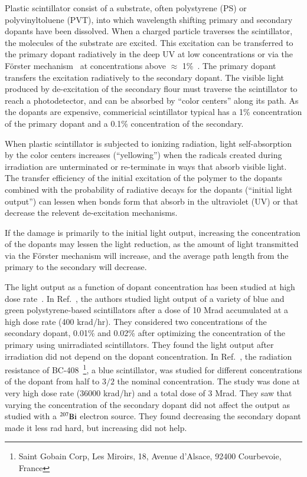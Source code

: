 \documentclass[review]{elsarticle}
\begin{document}
Plastic scintillator consist of a substrate, 
often polystyrene (PS) or polyvinyltoluene (PVT),
into which wavelength 
shifting primary and secondary dopants have been dissolved.
When a charged particle traverses the scintillator, the molecules of the substrate are excited.  
This excitation can be transferred to the primary dopant radiatively 
in the deep UV at low concentrations or 
via the F{\"o}rster mechanism~\cite{forster} at concentrations above $\approx$ 1\%~\cite{birks}.  
The primary dopant transfers the excitation radiatively to the secondary dopant.  
The visible light produced by de-excitation of the secondary flour
must traverse the scintillator to reach a photodetector, 
and can be absorbed by ``color centers'' along its path.
As the dopants are expensive, commericial scintillator typical has a 1\% concentration of the
primary dopant and a 0.1\% concentration of the secondary.

When plastic scintillator is subjected to ionizing radiation,
light self-absorption by the color centers  increases (``yellowing'') when the 
radicals created during irradiation are unterminated or 
re-terminate in ways that absorb visible light.
The transfer efficiency of the initial excitation of the polymer to the
dopants combined with the probability of 
radiative decays for the dopants (``initial light output'') can lessen
when bonds form that absorb in the ultraviolet (UV) or 
that decrease the relevent de-excitation mechanisms.

If the damage is primarily to the initial light output, increasing the concentration 
of the dopants may lessen the light reduction, as the amount of light transmitted
via the F{\"o}rster mechanism will increase, and the average path length from the primary to the
secondary will decrease.

The light output as a function of dopant concentration has been studied
at high dose rate~\cite{Bross199135,Majewski1989500}.  
In Ref.~\cite{Bross199135}, the authors studied light output
of a variety of blue and  green polystyrene-based scintillators
after a dose of 10 Mrad accumulated at a high dose rate (400 krad/hr).
They considered two concentrations of the secondary dopant,
0.01\% and 0.02\% after optimizing the
concentration of the primary using unirradiated scintillators.  They found
the light output after irradiation did not depend on the dopant concentration.
In Ref.~\cite{Majewski1989500}, the radiation resistance of 
BC-408~\footnote{Saint Gobain Corp, Les Miroirs, 18, Avenue d'Alsace, 92400 Courbevoie, France},
a blue scintillator,
was studied for different concentrations of the dopant from half to $3/2$ 
the nominal concentration.  The study was done at very high dose rate 
(36000 krad/hr) and a total dose of 3 Mrad.  
They saw that varying the concentration of the secondary dopant 
did not affect the output as studied with a $\rm{^{207}Bi}$ electron source.  
They found decreasing the secondary dopant made it less rad hard, but increasing did not help.  
\end{document}

